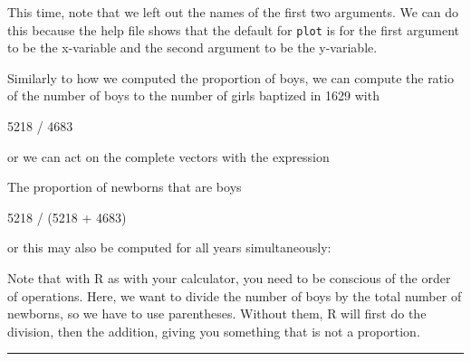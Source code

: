 \documentclass[]{book}
\newenvironment{Shaded}{\begin{snugshade}}{\end{snugshade}}
\newcommand{\DecValTok}[1]{\textcolor[rgb]{0.00,0.00,0.81}{{#1}}}
\newcommand{\StringTok}[1]{\textcolor[rgb]{0.31,0.60,0.02}{{#1}}}
\newcommand{\NormalTok}[1]{{#1}}
\theoremstyle{definition}
\theoremstyle{definition}
\theoremstyle{definition}
\theoremstyle{remark}
\begin{document}
This time, note that we left out the names of the first two arguments.
We can do this because the help file shows that the default for
\texttt{plot} is for the first argument to be the x-variable and the
second argument to be the y-variable.

Similarly to how we computed the proportion of boys, we can compute the
ratio of the number of boys to the number of girls baptized in 1629 with

\begin{Shaded}
\begin{Highlighting}[]
\DecValTok{5218} \NormalTok{/}\StringTok{ }\DecValTok{4683}
\end{Highlighting}
\end{Shaded}

or we can act on the complete vectors with the expression

\begin{Shaded}
\end{Shaded}

The proportion of newborns that are boys

\begin{Shaded}
\begin{Highlighting}[]
\DecValTok{5218} \NormalTok{/}\StringTok{ }\NormalTok{(}\DecValTok{5218} \NormalTok{+}\StringTok{ }\DecValTok{4683}\NormalTok{)}
\end{Highlighting}
\end{Shaded}

or this may also be computed for all years simultaneously:

\begin{Shaded}
\end{Shaded}

Note that with R as with your calculator, you need to be conscious of
the order of operations. Here, we want to divide the number of boys by
the total number of newborns, so we have to use parentheses. Without
them, R will first do the division, then the addition, giving you
something that is not a proportion.

\begin{center}\rule{0.5\linewidth}{\linethickness}\end{center}
\end{document}
